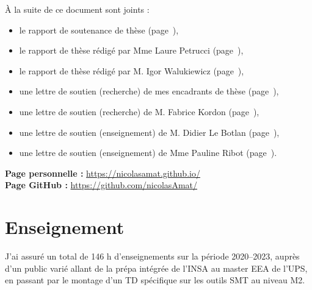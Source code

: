 \documentclass[11pt,a4paper]{moderncv}
\begin{document}
À la suite de ce document sont joints :
\begin{itemize}
  \item le rapport de soutenance de thèse (page~\pageref{soutenance.1}),
    \item le rapport de thèse rédigé par Mme Laure Petrucci (page~\pageref{petrucci.2}),
    \item le rapport de thèse rédigé par M. Igor Walukiewicz (page~\pageref{walukiewicz.6}),
    \item une lettre de soutien (recherche) de mes encadrants de thèse (page~\pageref{encadrants.10}),
    \item une lettre de soutien (recherche) de M. Fabrice Kordon (page~\pageref{kordon.12}),
    \item une lettre de soutien (enseignement) de M. Didier Le Botlan (page~\pageref{lebotlan.14}),
    \item une lettre de soutien (enseignement) de Mme Pauline Ribot (page~\pageref{ribot.15}).\\
\end{itemize}

\textbf{Page personnelle :} \url{https://nicolasamat.github.io/}\\

\textbf{Page GitHub :} \url{https://github.com/nicolasAmat/}
\newpage

\vspace{10pt}
\section*{Enseignement}
\vspace{10pt}

J'ai assuré un total de 146 h d'enseignements sur la période 2020--2023,
auprès d'un public varié allant de la prépa intégrée de l'INSA au master EEA de l'UPS,
en passant par le montage d'un TD spécifique sur les outils SMT au niveau M2.\\
\end{document}
